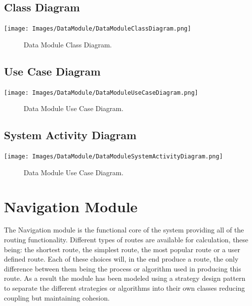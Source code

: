 \documentclass[a4paper, 12pt, one column]{article}
\begin{document}
\begin{center}
\subsection{Class Diagram}
        \texttt{[image: Images/DataModule/DataModuleClassDiagram.png]}
        \begin{figure}[h]
            \caption{Data Module Class Diagram.}
        \end{figure}
        
\subsection{Use Case Diagram}
        \texttt{[image: Images/DataModule/DataModuleUseCaseDiagram.png]}
        \begin{figure}[h]
            \caption{Data Module Use Case Diagram.}
        \end{figure}
        
\subsection{System Activity Diagram}
        \texttt{[image: Images/DataModule/DataModuleSystemActivityDiagram.png]}
        \begin{figure}[h]
            \caption{Data Module Use Case Diagram.}
        \end{figure}
\end{center}
        
\section{Navigation Module}
The Navigation module is the functional core of the system providing all of the routing functionality. Different types of routes are available for calculation, these being: the shortest route, the simplest route, the most popular route or a user defined route. Each of these choices will, in the end produce a route, the only difference between them being the process or algorithm used in producing this route. As a result the module has been modeled using a strategy design pattern to separate the different strategies or algorithms into their own classes reducing coupling but maintaining cohesion.
\end{document}
